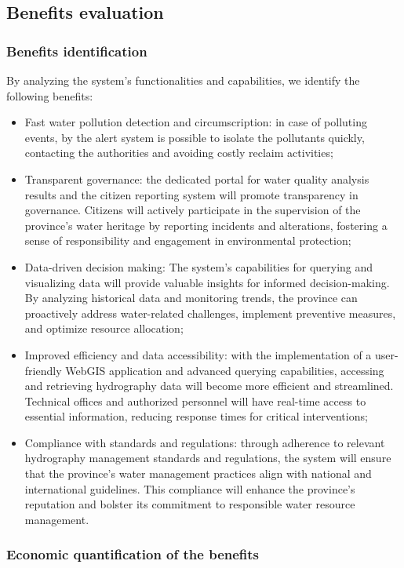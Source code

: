 \subsection{Benefits evaluation}
\subsubsection{Benefits identification}
By analyzing the system's functionalities and capabilities, we identify the following benefits:
\begin{itemize}
    \item Fast water pollution detection and circumscription: in case of polluting events, by the alert system is possible to isolate the pollutants quickly, contacting the authorities and avoiding costly reclaim activities;
    \item Transparent governance: the dedicated portal for water quality analysis results and the citizen reporting system will promote transparency in governance. Citizens will actively participate in the supervision of the province's water heritage by reporting incidents and alterations, fostering a sense of responsibility and engagement in environmental protection;
    \item Data-driven decision making: The system's capabilities for querying and visualizing data will provide valuable insights for informed decision-making. By analyzing historical data and monitoring trends, the province can proactively address water-related challenges, implement preventive measures, and optimize resource allocation;
    \item Improved efficiency and data accessibility: with the implementation of a user-friendly WebGIS application and advanced querying capabilities, accessing and retrieving hydrography data will become more efficient and streamlined. Technical offices and authorized personnel will have real-time access to essential information, reducing response times for critical interventions;
    \item Compliance with standards and regulations: through adherence to relevant hydrography management standards and regulations, the system will ensure that the province's water management practices align with national and international guidelines. This compliance will enhance the province's reputation and bolster its commitment to responsible water resource management.
\end{itemize}

\subsubsection{Economic quantification of the benefits}


